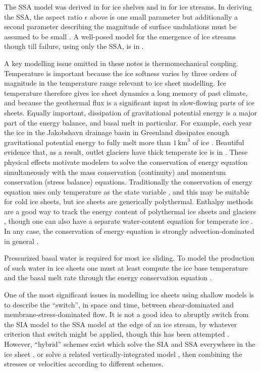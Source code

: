 \documentclass[letterpaper,final,12pt,reqno]{amsart}
\newcommand{\eps}{\epsilon}
\begin{document}
The SSA model \cite{WeisGreveHutter} was derived in \cite{Morland} for ice shelves and in \cite{MacAyeal} for ice streams.  In deriving the SSA, the aspect ratio $\eps$ above is one small parameter but additionally a second parameter describing the magnitude of surface undulations must be assumed to be small  \cite{SchoofStream,SchoofHindmarsh}.  A well-posed model for the emergence of ice streams though till failure, using only the SSA, is in \cite{SchoofStream}.

A key modelling issue omitted in these notes is thermomechanical coupling.  Temperature is important because the ice softness varies by three orders of magnitude in the temperature range relevant to ice sheet modelling.  Ice temperature therefore gives ice sheet dynamics a long memory of past climate, and because the geothermal flux is a significant input in slow-flowing parts of ice sheets.  Equally important, dissipation of gravitational potential energy is a major part of the energy balance, and basal melt in particular.  For example, each year the ice in the Jakobshavn drainage basin in Greenland dissipates enough gravitational potential energy to fully melt more than $1\,\text{km}^3$ of ice \cite{AschwandenBuelerKhroulevBlatter}.  Beautiful evidence that, as a result, outlet glaciers have thick temperate ice is in \cite{Luethietal2009}.  These physical effects motivate modelers to solve the conservation of energy equation simultaneously with the mass conservation (continuity) and momentum conservation (stress balance) equations.  Traditionally the conservation of energy equation uses only temperature as the state variable \cite{BBL}, and this may be suitable for cold ice sheets, but ice sheets are generically polythermal.  Enthalpy methods are a good way to track the energy content of polythermal ice sheets and glaciers \cite{AschwandenBuelerKhroulevBlatter}, though one can also have a separate water-content equation for temperate ice \cite{Greve}.  In any case, the conservation of energy equation is strongly advection-dominated in general \cite{BBL}.

Pressurized basal water is required for most ice sliding.  To model the production of such water in ice sheets one must at least compute the ice base temperature and the basal melt rate through the energy conservation equation \cite{BBssasliding,Clarke05,Raymondenergy,Tulaczyketal2000b}.

One of the most significant issues in modelling ice sheets using shallow models is to describe the ``switch'', in space and time, between shear-dominated and membrane-stress-dominated flow.  It is not a good idea to abruptly switch from the SIA model to the SSA model at the edge of an ice stream, by whatever criterion that switch might be applied, though this has been attempted \cite{HulbeMacAyeal,Ritzetal2001}.  However, ``hybrid'' schemes exist which solve the SIA and SSA everywhere in the ice sheet \cite{BBssasliding,Winkelmannetal2011}, or solve a related vertically-integrated model \cite{Goldberg2011,PollardDeConto}, then combining the stresses or velocities according to different schemes.
\end{document}
